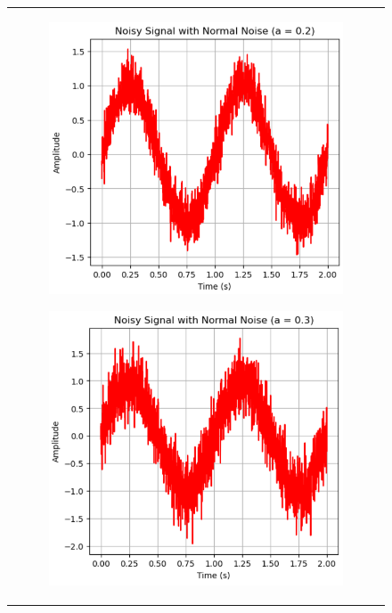 \documentclass[hidelinks,12pt]{article}
\begin{document}
	
	\begin{figure}[!h]
		\centering
		\begin{tabular}{c}
			\begin{subfigure}[h]{0.3\textwidth}
				\centering
				\includegraphics[width=\textwidth]{figures/normal_noise/0.2.png}
			\end{subfigure}
			\hfill
			\begin{subfigure}[h]{0.3\textwidth}
				\centering
				\includegraphics[width=\textwidth]{figures/normal_noise/0.3.png}

\end{subfigure}
\end{tabular}
\end{figure}
\end{document}
